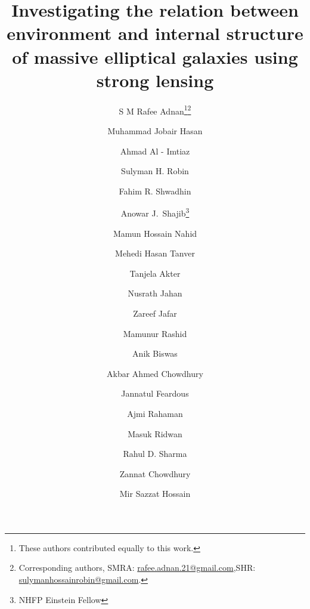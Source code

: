 \documentclass{aa}
\begin{document}
 


   \title{Investigating the relation between environment and internal structure of massive elliptical galaxies using strong lensing}


   
   \subtitle{}

   \author{S M Rafee Adnan\inst{\ref{uofl},\ref{sustphy},\ref{camsust}}\fnmsep\thanks{These authors contributed equally to this work.}\fnmsep\thanks{Corresponding authors, SMRA: \href{mailto:rafee.adnan.21@gmail.com}{rafee.adnan.21@gmail.com},\newline SHR: \href{mailto:sulymanhossainrobin@gmail.com}{sulymanhossainrobin@gmail.com}.}
   \and
   Muhammad Jobair Hasan\inst{\ref{sustphy}, \ref{camsust}, \star}
   \and
   Ahmad Al - Imtiaz\inst{\ref{sustphy},\ref{camsust},\star}
   \and
   Sulyman H. Robin\inst{\ref{camsust},\ref{sustphy},\star,\star\star}
   \and
   Fahim R. Shwadhin\inst{\ref{bauet},\star}
   \and
   Anowar J.~Shajib\inst{\ref{uchicago},\ref{kicp}}\fnmsep\thanks{NHFP Einstein Fellow}
   \and
   Mamun Hossain Nahid\inst{\ref{sustphy}}
   \and
   Mehedi Hasan Tanver\inst{\ref{camsust},\ref{sustmath}}
   \and 
   Tanjela Akter\inst{\ref{sustphy}}
   \and
   Nusrath Jahan\inst{\ref{sustphy},\ref{camsust}}
   \and
   Zareef Jafar\inst{\ref{iub},\ref{brac}}
   \and
   Mamunur Rashid\inst{\ref{camsust},\ref{sustphy}}
   \and
   Anik Biswas\inst{\ref{buet}}
   \and
   Akbar Ahmed Chowdhury\inst{\ref{iubps}}
   \and
   Jannatul Feardous\inst{\ref{ruet}}
   \and
   Ajmi Rahaman\inst{\ref{sustmath}}
   \and
   Masuk Ridwan\inst{\ref{buet}}
   \and
   Rahul D. Sharma\inst{\ref{sustphy}}
   \and
   Zannat Chowdhury\inst{\ref{iubcse}}
   \and
   Mir Sazzat Hossain\inst{\ref{iub}}
   }
   
\end{document}

